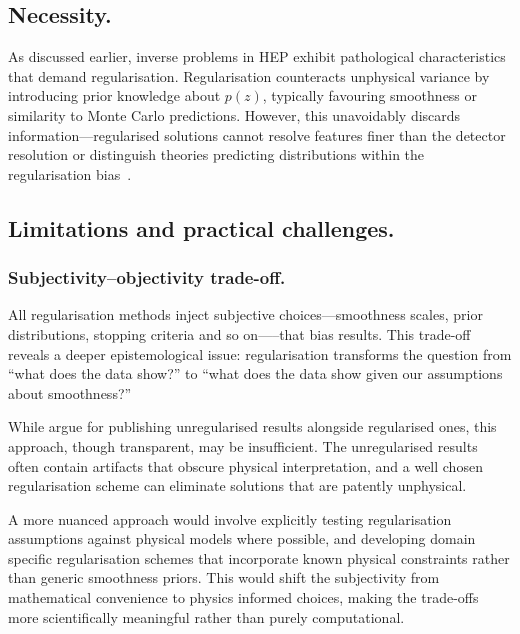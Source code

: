     \subsection{Necessity.}  
         As discussed earlier, inverse problems in HEP exhibit pathological characteristics that demand regularisation.
        Regularisation counteracts unphysical variance by introducing prior knowledge about \(p(z)\), typically favouring smoothness or similarity to Monte Carlo predictions.
        However, this unavoidably discards information---regularised solutions cannot resolve features finer than the detector resolution or distinguish theories predicting distributions within the regularisation bias~\cite{Bohm2025IntroductionPhysicists,multhei_iterative_1987}.

    \subsection{Limitations and practical challenges.}
        \subsubsection{Subjectivity--objectivity trade-off.}  
            All regularisation methods inject subjective choices---smoothness scales, prior distributions, stopping criteria and so on—--that bias results.
            This trade-off reveals a deeper epistemological issue: regularisation transforms the question from ``what does the data show?'' to ``what does the data show given our assumptions about smoothness?''
            
            While \cite{zech_regularization_2011,kuusela_uncertainty_2016} argue for publishing unregularised results alongside regularised ones, this approach, though transparent, may be insufficient.
            The unregularised results often contain artifacts that obscure physical interpretation, and a well chosen regularisation scheme can eliminate solutions that are patently unphysical.
            
            A more nuanced approach would involve explicitly testing regularisation assumptions against physical models where possible, and developing domain specific regularisation schemes that incorporate known physical constraints rather than generic smoothness priors.
            This would shift the subjectivity from mathematical convenience to physics informed choices, making the trade-offs more scientifically meaningful rather than purely computational.

